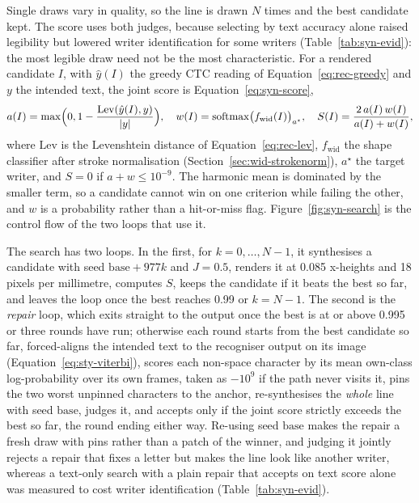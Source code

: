 Single draws vary in quality, so the line is drawn $N$ times and the best candidate kept.
The score uses both judges, because selecting by text accuracy alone raised legibility but lowered writer identification for some writers (Table~\ref{tab:syn-evid}): the most legible draw need not be the most characteristic.
For a rendered candidate $I$, with $\hat y(I)$ the greedy CTC reading of Equation~\ref{eq:rec-greedy} and $y$ the intended text, the joint score is Equation~\ref{eq:syn-score},
\begin{equation}
a(I)=\max\Bigl(0,1-\frac{\mathrm{Lev}(\hat y(I),y)}{|y|}\Bigr),\quad w(I)=\mathrm{softmax}\bigl(f_{\mathrm{wid}}(I)\bigr)_{a^\star},\quad S(I)=\frac{2\,a(I)\,w(I)}{a(I)+w(I)},
\label{eq:syn-score}
\end{equation}
where $\mathrm{Lev}$ is the Levenshtein distance of Equation~\ref{eq:rec-lev}, $f_{\mathrm{wid}}$ the shape classifier after stroke normalisation (Section~\ref{sec:wid-strokenorm}), $a^\star$ the target writer, and $S=0$ if $a+w\le10^{-9}$.
The harmonic mean is dominated by the smaller term, so a candidate cannot win on one criterion while failing the other, and $w$ is a probability rather than a hit-or-miss flag.
Figure~\ref{fig:syn-search} is the control flow of the two loops that use it.

The search has two loops.
In the first, for $k=0,\ldots,N-1$, it synthesises a candidate with seed $\mathrm{base}+977k$ and $J=0.5$, renders it at 0.085 x-heights and 18 pixels per millimetre, computes $S$, keeps the candidate if it beats the best so far, and leaves the loop once the best reaches 0.99 or $k=N-1$.
The second is the \emph{repair} loop, which exits straight to the output once the best is at or above 0.995 or three rounds have run; otherwise each round starts from the best candidate so far, forced-aligns the intended text to the recogniser output on its image (Equation~\ref{eq:sty-viterbi}), scores each non-space character by its mean own-class log-probability over its own frames, taken as $-10^9$ if the path never visits it, pins the two worst unpinned characters to the anchor, re-synthesises the \emph{whole} line with seed $\mathrm{base}$, judges it, and accepts only if the joint score strictly exceeds the best so far, the round ending either way.
Re-using seed $\mathrm{base}$ makes the repair a fresh draw with pins rather than a patch of the winner, and judging it jointly rejects a repair that fixes a letter but makes the line look like another writer, whereas a text-only search with a plain repair that accepts on text score alone was measured to cost writer identification (Table~\ref{tab:syn-evid}).

